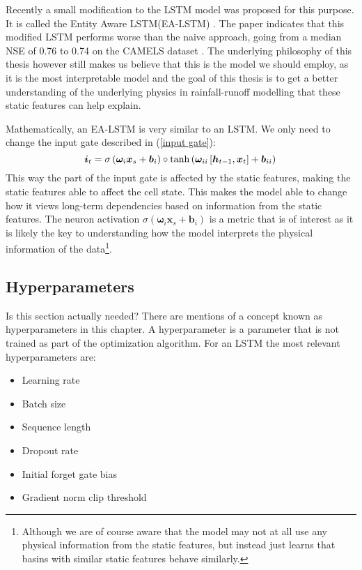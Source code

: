 Recently a small modification to the LSTM model was proposed for this purpose. 
It is called the Entity Aware LSTM(EA-LSTM) \cite{lstm_second_paper}. The paper 
indicates that this modified LSTM performs worse than the naive approach, going 
from a median NSE of 0.76 to 0.74 on the CAMELS dataset \cite{CAMELS_US}. The 
underlying philosophy of this thesis however still makes us believe that this is 
the model we should employ, as it is the most interpretable model \cite{lstm_second_paper} 
and the goal of this thesis is to get a better understanding of the underlying 
physics in rainfall-runoff modelling that these static features can help explain.

Mathematically, an EA-LSTM is very similar to an LSTM. We only need to change the 
input gate described in (\ref{input gate}): 
\begin{equation}
    \bm{i}_t = \sigma\left(\bm{\omega}_i  \bm{x}_s + \bm{b}_i\right) \circ \tanh\left(\bm{\omega}_{ii}\left[ \bm{h}_{t-1},\bm{x}_t  \right] + \bm{b}_{ii}\right) \label{EA-LSTM input gate}\\
\end{equation}
This way the part of the input gate is affected by the static features, making 
the static features able to affect the cell state. This makes the model able to 
change how it views long-term dependencies based on information from the static features. 
The neuron activation $\sigma (\bm{\omega}_i \bm{x}_s + \bm{b}_i)$ is a metric that 
is of interest as it is likely the key to understanding how the model interprets 
the physical information of the data\footnote{Although we are of course aware that 
the model may not at all use any physical information from the static features, but 
instead just learns that basins with similar static features behave similarly.}. 


\subsection{Hyperparameters}
\label{Hyperparameters}
Is this section actually needed?
There are mentions of a concept known as hyperparameters in this chapter. A hyperparameter 
is a parameter that is not trained as part of the optimization algorithm. For an 
LSTM the most relevant hyperparameters are:
\begin{itemize}
    \item Learning rate
    \item Batch size
    \item Sequence length
    \item Dropout rate
    \item Initial forget gate bias
    \item Gradient norm clip threshold
\end{itemize}
